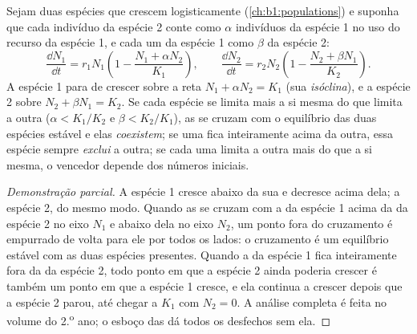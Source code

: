 \begin{proposition}\label{prop:b1:species-interactions:lotka}
Sejam duas espécies que crescem logisticamente
(\cref{ch:b1:populations}) e suponha que cada indivíduo da espécie 2
conte como $\alpha$ indivíduos da espécie 1 no uso do recurso da
espécie 1, e cada um da espécie 1 como $\beta$ da espécie 2:
\[
\frac{\dd N_1}{\dd t} = r_1 N_1\left(1 - \frac{N_1 + \alpha N_2}{K_1}\right),
\qquad
\frac{\dd N_2}{\dd t} = r_2 N_2\left(1 - \frac{N_2 + \beta N_1}{K_2}\right).
\]
A espécie 1 para de crescer sobre a reta $N_1 + \alpha N_2 = K_1$ (sua
\emph{isóclina}), e a espécie 2 sobre
$N_2 + \beta N_1 = K_2$. Se cada espécie se limita mais a si mesma do
que limita a outra ($\alpha <
K_1/K_2$ e $\beta < K_2/K_1$), as  se cruzam com o equilíbrio
das duas espécies estável e elas \emph{coexistem}; se uma 
fica inteiramente acima da outra, essa espécie sempre \emph{exclui} a
outra; se cada uma limita a outra mais do que a si mesma, o vencedor
depende dos números iniciais.
\end{proposition}
\begin{proof}[Demonstração parcial]
A espécie 1 cresce abaixo da sua  e decresce acima dela; a
espécie 2, do mesmo modo. Quando as  se cruzam com a da
espécie 1 acima da da espécie 2 no eixo $N_1$ e abaixo dela no eixo
$N_2$, um ponto fora do cruzamento é empurrado de volta para ele por
todos os lados: o cruzamento é um equilíbrio estável com as duas
espécies presentes. Quando a  da espécie 1 fica inteiramente
fora da da espécie 2, todo ponto em que a espécie 2 ainda poderia
crescer é também um ponto em que a espécie 1 cresce, e ela continua a
crescer depois que a espécie 2 parou, até chegar a $K_1$ com
$N_2 = 0$. A análise completa é feita no volume do
2.\textsuperscript{o} ano; o esboço das  dá todos os
desfechos sem ela.
\end{proof}

